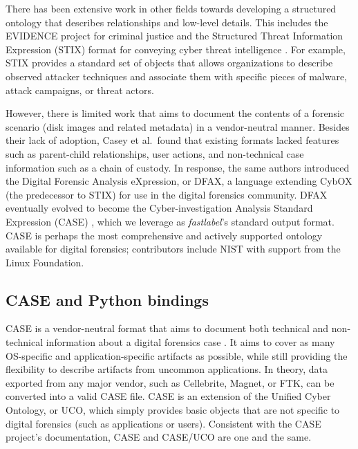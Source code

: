 \documentclass[letterpaper,12pt]{report}
\begin{document}
There has been extensive work in other fields towards developing a
structured ontology that describes relationships and low-level details.
This includes the EVIDENCE project for criminal justice and the
Structured Threat Information Expression (STIX) format for conveying
cyber threat intelligence
\cite{caseyLeveragingCybOXStandardize2015}. For example, STIX
provides a standard set of objects that allows organizations to describe
observed attacker techniques and associate them with specific pieces of
malware, attack campaigns, or threat actors.

However, there is limited work that aims to document the contents of a
forensic scenario (disk images and related metadata) in a vendor-neutral
manner. Besides their lack of adoption, Casey et al.~found that existing
formats lacked features such as parent-child relationships, user
actions, and non-technical case information such as a chain of custody.
In response, the same authors introduced the Digital Forensic Analysis
eXpression, or DFAX, a language extending CybOX (the predecessor to
STIX) for use in the digital forensics community. DFAX eventually
evolved to become the Cyber-investigation Analysis Standard Expression
(CASE) \cite{caseyAdvancingCoordinatedCyberinvestigations2017},
which we leverage as \emph{fastlabel}'s standard output format. CASE is
perhaps the most comprehensive and actively supported ontology available
for digital forensics; contributors include NIST with support from the
Linux Foundation.

\subsection{CASE and Python
bindings}\label{case-and-python-bindings}

CASE is a vendor-neutral format that aims to document both technical and
non-technical information about a digital forensics case
\cite{caseyAdvancingCoordinatedCyberinvestigations2017}. It aims to
cover as many OS-specific and application-specific artifacts as
possible, while still providing the flexibility to describe artifacts
from uncommon applications. In theory, data exported from any major
vendor, such as Cellebrite, Magnet, or FTK, can be converted into a
valid CASE file. CASE is an extension of the Unified Cyber Ontology, or
UCO, which simply provides basic objects that are not specific to
digital forensics (such as applications or users). Consistent with the
CASE project's documentation, CASE and CASE/UCO are one and the same.
\end{document}
